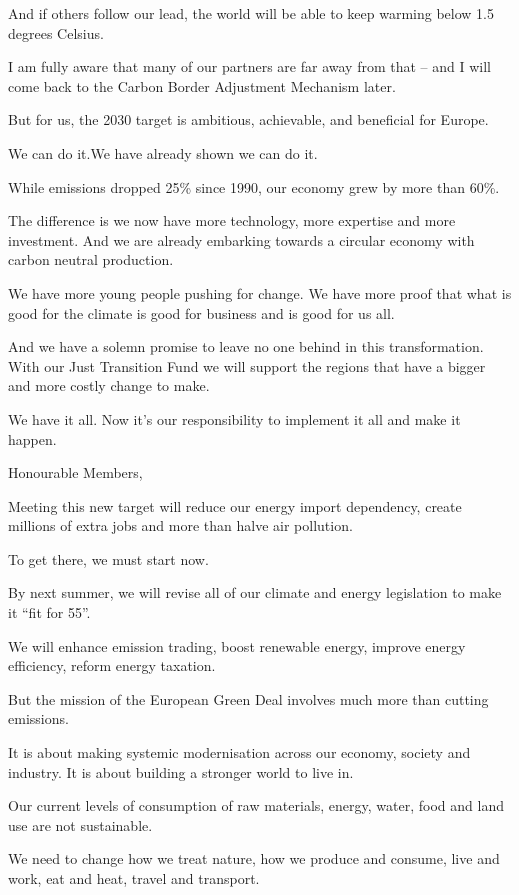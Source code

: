 \documentclass[a4paper,11pt]{article}
\begin{document}
And if others follow our lead, the world will be able to keep warming below 1.5 degrees Celsius.

I am fully aware that many of our partners are far away from that – and I will come back to the Carbon Border Adjustment Mechanism later.

But for us, the 2030 target is ambitious, achievable, and beneficial for Europe.

We can do it.We have already shown we can do it.

While emissions dropped 25\% since 1990, our economy grew by more than 60\%.

The difference is we now have more technology, more expertise and more investment. And we are already embarking towards a circular economy with carbon neutral production.

We have more young people pushing for change. We have more proof that what is good for the climate is good for business and is good for us all. 

And we have a solemn promise to leave no one behind in this transformation. With our Just Transition Fund we will support the regions that have a bigger and more costly change to make.

We have it all. Now it's our responsibility to implement it all and make it happen.

 

Honourable Members,

Meeting this new target will reduce our energy import dependency, create millions of extra jobs and more than halve air pollution.

To get there, we must start now.

By next summer, we will revise all of our climate and energy legislation to make it “fit for 55”.

We will enhance emission trading, boost renewable energy, improve energy efficiency, reform energy taxation. 

But the mission of the European Green Deal involves much more than cutting emissions.

It is about making systemic modernisation across our economy, society and industry. It is about building a stronger world to live in.

Our current levels of consumption of raw materials, energy, water, food and land use are not sustainable.

We need to change how we treat nature, how we produce and consume, live and work, eat and heat, travel and transport.
\end{document}

